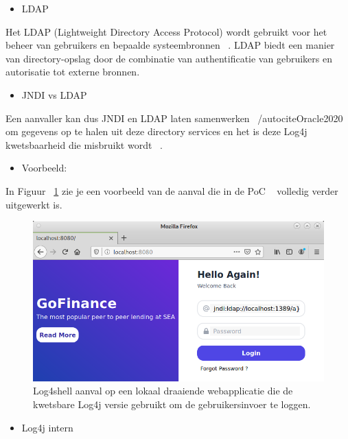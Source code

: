 \documentclass{hogent-article}
\begin{document}
\begin{itemize}[leftmargin=*]
    \item LDAP
\end{itemize}

Het LDAP (Lightweight Directory Access Protocol) wordt gebruikt voor het beheer van gebruikers en bepaalde systeembronnen ~\autocite{Microsoft2018}.
LDAP biedt een manier van directory-opslag door de combinatie van authentificatie van gebruikers en autorisatie tot externe bronnen.

\begin{itemize}[leftmargin=*]
    \item JNDI vs LDAP
\end{itemize}

Een aanvaller kan dus JNDI en LDAP laten samenwerken ~/autocite{Oracle2020} om gegevens op te halen uit deze directory services en het is deze Log4j kwetsbaarheid die misbruikt wordt ~\autocite{Conikee2021}.

\begin{itemize}[leftmargin=*]
\item Voorbeeld:
\end{itemize}

In Figuur ~\ref{fig:jndi-ldaplookup} zie je een voorbeeld van de aanval die in de PoC ~\autocite{Akkurt2022} volledig verder uitgewerkt is.

\begin{figure}[!ht]
    \centering
    \includegraphics[width=1\linewidth]{img/jndi-ldaplookup.png}
    \caption{Log4shell aanval op een lokaal draaiende webapplicatie die de kwetsbare Log4j versie gebruikt om de gebruikersinvoer te loggen.}
    \label{fig:jndi-ldaplookup}
\end{figure}

\begin{itemize}[leftmargin=*]
    \item Log4j intern
\end{itemize}
\end{document}
